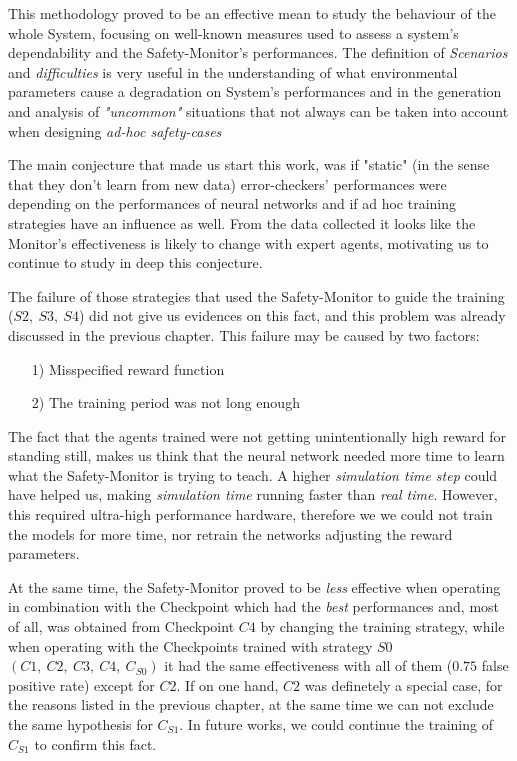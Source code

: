 This methodology proved to be an effective mean to study the behaviour of the whole System, focusing on well-known measures used to assess a system's dependability and the Safety-Monitor's performances. The definition of \textsl{Scenarios} and \textsl{difficulties} is very useful in the understanding of what environmental parameters cause a degradation on System's performances and in the generation and analysis of \textsl{"uncommon"} situations that not always can be taken into account when designing \textsl{ad-hoc safety-cases}
\newline

The main conjecture that made us start this work, was if "static" (in the sense that they don't learn from new data) error-checkers' performances were depending on the performances of neural networks and if ad hoc training strategies have an influence as well. From the data collected it looks like the Monitor's effectiveness is likely to change with expert agents, motivating us to continue to study in deep this conjecture.

The failure of those strategies that used the Safety-Monitor to guide the training ($S2,\: S3,\: S4$) did not give us evidences on this fact, and this problem was already discussed in the previous chapter. This failure may be caused by two factors:

\begin{itemize}
	\item[1)] Misspecified reward function
	\item[2)] The training period was not long enough
\end{itemize}

The fact that the agents trained were not getting unintentionally high reward for standing still, makes us think that the neural network needed more time to learn what the Safety-Monitor is trying to teach. A higher \textsl{simulation time step} could have helped us, making \textsl{simulation time} running faster than \textsl{real time}. However, this required ultra-high performance hardware, therefore we we could not train the models for more time, nor retrain the networks adjusting the reward parameters.

At the same time, the Safety-Monitor proved to be \textsl{less} effective when operating in combination with the Checkpoint which had the \textsl{best} performances and, most of all, was obtained from Checkpoint $C4$ by changing the training strategy, while when operating with the Checkpoints trained with strategy $S0$ $(C1,\: C2,\: C3,\: C4,\: C_{S0})$ it had the same effectiveness with all of them ($0.75$ false positive rate) except for $C2$. If on one hand, $C2$ was definetely a special case, for the reasons listed in the previous chapter, at the same time we can not exclude the same hypothesis for $C_{S1}$. In future works, we could continue the training of $C_{S1}$ to confirm this fact.\newline\newline

